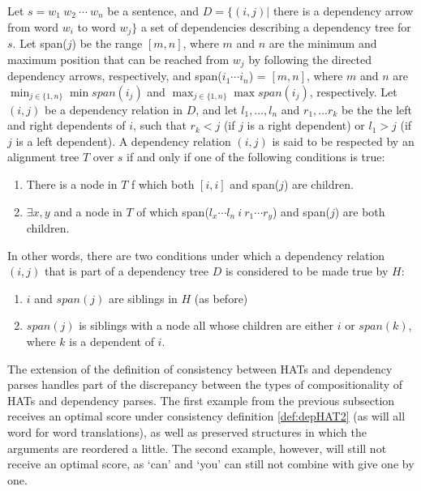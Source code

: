 \begin{definition}[]\label{def:depHAT2}
Let $s = w_1~w_2~\cdots~w_n$ be a sentence, and $D = \{ (i,j) |$ there is a dependency arrow from word $w_i$ to word $w_j \}$ a set of dependencies describing a dependency tree for $s$. Let span($j$) be the range $[m,n]$, where $m$ and $n$ are the minimum and maximum position that can be reached from $w_j$ by following the directed dependency arrows, respectively, and span($i_1 \cdots i_n$) = $[m,n]$, where $m$ and $n$ are $\min_{j\in\{1,n\}} \min span(i_j)$ and $\max_{j\in\{1,n\}} \max span(i_j)$, respectively. Let $(i,j)$ be a dependency relation in $D$, and let $l_1,\ldots,l_n$ and $r_1,\ldots r_k$ be the the left and right dependents of $i$, such that $r_k < j$ (if $j$ is a right dependent) or $l_1 > j$ (if $j$ is a left dependent). A dependency relation $(i,j)$ is said to be respected by an alignment tree $T$ over $s$ if and only if one of the following conditions is true: \begin{enumerate}
\item There is a node in $T$ f which both $[i,i]$ and span($j$) are children.
\item $\exists x,y$  and a node in $T$ of which span($l_x\cdots l_n~i~r_1 \cdots r_y$) and span($j$) are both children.
\end{enumerate} 
\end{definition}

In other words, there are two conditions under which a dependency relation $(i,j)$ that is part of a dependency tree $D$ is considered to be made true by $H$:\begin{enumerate}
\item $i$ and $span(j)$ are siblings in $H$ (as before)
\item $span(j)$ is siblings with a node all whose children are either $i$ or $span(k)$, where $k$ is a dependent of $i$.
\end{enumerate}

The extension of the definition of consistency between HATs and dependency parses handles part of the discrepancy between the types of compositionality of HATs and dependency parses. The first example from the previous subsection receives an optimal score under consistency definition \ref{def:depHAT2} (as will all word for word translations), as well as preserved structures in which the arguments are reordered a little. The second example, however, will still not receive an optimal score, as `can' and `you' can still not combine with give one by one.

